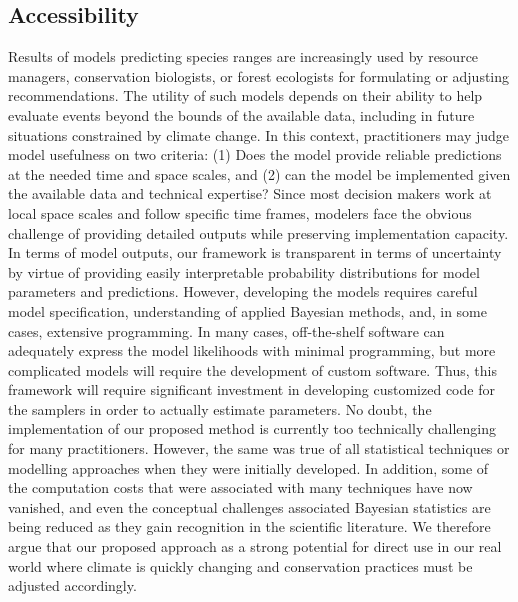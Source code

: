 \subsection*{Accessibility}
Results of models predicting species ranges are increasingly used by resource managers, conservation biologists, or forest ecologists for formulating or adjusting recommendations. 
The utility of such models depends on their ability to help evaluate events beyond the bounds of the available data, including in future situations constrained by climate change. 
In this context, practitioners may judge model usefulness on two criteria: (1) Does the model provide reliable predictions at the needed time and space scales, and (2) can the model be implemented given the available data and technical expertise? 
Since most decision makers work at local space scales and follow specific time frames, modelers face the obvious challenge of providing detailed outputs while preserving implementation capacity.
In terms of model outputs, our framework is transparent in terms of uncertainty by virtue of providing easily interpretable probability distributions for model parameters and predictions.
However, developing the models requires careful model specification, understanding of applied Bayesian methods, and, in some cases, extensive programming.
In many cases, off-the-shelf software \citep[e.g.,][]{R, RJAGS} can adequately express the model likelihoods with minimal programming, but more complicated models will require the development of custom software.
Thus, this framework will require significant investment in developing customized code for the samplers in order to actually estimate parameters.
No doubt, the implementation of our proposed method is currently too technically challenging for many practitioners. 
However, the same was true of all statistical techniques or modelling approaches when they were initially developed. 
In addition, some of the computation costs that were associated with many techniques have now vanished, and even the conceptual challenges associated Bayesian statistics are being reduced as they gain recognition in the scientific literature. 
We therefore argue that our proposed approach as a strong potential for direct use in our real world where climate is quickly changing and conservation practices must be adjusted accordingly.

